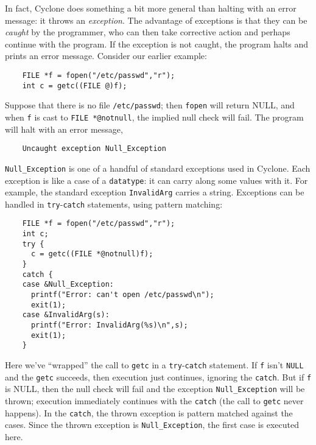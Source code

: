 In fact, Cyclone does something a bit more general than halting with
an error message: it throws an \emph{exception}.  The advantage of
exceptions is that they can be \emph{caught} by the programmer, who
can then take corrective action and perhaps continue with the program.
If the exception is not caught, the program halts and prints an error
message.  Consider our earlier example:
\begin{verbatim}
    FILE *f = fopen("/etc/passwd","r");
    int c = getc((FILE @)f);
\end{verbatim}
Suppose that there is no file \texttt{/etc/passwd}; then
\texttt{fopen} will return NULL, and when \texttt{f} is cast to
\texttt{FILE *@notnull}, the implied null check will fail.  The program will
halt with an error message,
\begin{verbatim}
    Uncaught exception Null_Exception
\end{verbatim}
\texttt{Null_Exception} is one of a handful of standard exceptions
used in Cyclone.  Each exception is like a case of a \texttt{datatype}:
it can carry along some values with it.  For example, the standard
exception \texttt{InvalidArg} carries a string.  Exceptions can be
handled in \texttt{try}-\texttt{catch} statements, using pattern
matching:
\begin{verbatim}
    FILE *f = fopen("/etc/passwd","r");
    int c;
    try {
      c = getc((FILE *@notnull)f);
    }
    catch {
    case &Null_Exception:
      printf("Error: can't open /etc/passwd\n");
      exit(1);
    case &InvalidArg(s):
      printf("Error: InvalidArg(%s)\n",s);
      exit(1);
    }
\end{verbatim}
Here we've ``wrapped'' the call to \texttt{getc} in a
\texttt{try}-\texttt{catch} statement.  If \texttt{f} isn't \texttt{NULL} and
the \texttt{getc} succeeds, then execution just continues, ignoring
the \texttt{catch}.  But if \texttt{f} is NULL, then the null check
will fail and the exception \texttt{Null_Exception} will be thrown;
execution immediately continues with the \texttt{catch} (the call to
\texttt{getc} never happens).  In the \texttt{catch}, the thrown
exception is pattern matched against the cases.  Since the thrown
exception is \texttt{Null_Exception}, the first case is executed here.


